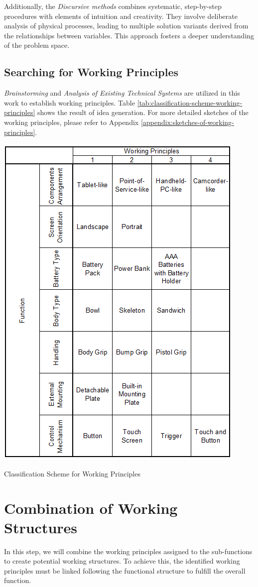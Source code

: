 Additionally, the \textit{Discursive methods} \cite[89-103]{Pahl2007} combines systematic, step-by-step procedures with elements of intuition and creativity. They involve deliberate analysis of physical processes, leading to multiple solution variants derived from the relationships between variables. This approach fosters a deeper understanding of the problem space.

\subsection{Searching for Working Principles}
\textit{Brainstorming} and \textit{Analysis of Existing Technical Systems} are utilized in this work to establish working principles. Table \ref{tab:classification-scheme-working-principles} shows the result of idea generation. For more detailed sketches of the working principles, please refer to Appendix \ref{appendix:sketches-of-working-principles}.

\begin{table}[H]
    \centering
    \includegraphics[width=0.6\linewidth]{texs/Part1/chapter3/image/stotal.png}
    \caption{Classification Scheme for Working Principles}
    \label{tab:classification-scheme-working-principles}
\end{table}


\section{Combination of Working Structures}
In this step, we will combine the working principles assigned to the sub-functions to create potential working structures. To achieve this, the identified working principles must be linked following the functional structure to fulfill the overall function.

